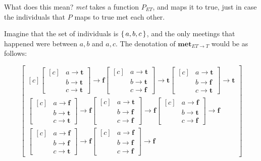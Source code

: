 \documentclass[letterpaper,parskip=half]{scrartcl}
\begin{document}
What does this mean? \emph{met} takes a function \(P_{ET}\), and maps it to true, just in case the individuals that \(P\) maps to true met each other.

Imagine that the set of individuals is \(\set{a,b,c}\), and the only meetings that happened were between \(a,b\) and \(a,c\). The denotation of \(\mathbf{met}_{ET \to T}\) would be as follows:

\[\left[\begin{aligned}[c]
\left[\begin{aligned}[c]
&a \to \mathbf{t}\\
&b \to \mathbf{t}\\
&c \to \mathbf{t}
\end{aligned}\right] \to \mathbf{f}
\left[\begin{aligned}[c]
&a \to \mathbf{t}\\
&b \to \mathbf{t}\\
&c \to \mathbf{f}
\end{aligned}\right] \to \mathbf{t}
\left[\begin{aligned}[c]
&a \to \mathbf{t}\\
&b \to \mathbf{f}\\
&c \to \mathbf{t}
\end{aligned}\right] \to \mathbf{t}\\
\left[\begin{aligned}[c]
&a \to \mathbf{f}\\
&b \to \mathbf{t}\\
&c \to \mathbf{t}
\end{aligned}\right] \to \mathbf{f}
\left[\begin{aligned}[c]
&a \to \mathbf{t}\\
&b \to \mathbf{f}\\
&c \to \mathbf{f}
\end{aligned}\right] \to \mathbf{f}
\left[\begin{aligned}[c]
&a \to \mathbf{f}\\
&b \to \mathbf{t}\\
&c \to \mathbf{f}
\end{aligned}\right] \to \mathbf{f}\\
\left[\begin{aligned}[c]
&a \to \mathbf{f}\\
&b \to \mathbf{f}\\
&c \to \mathbf{t}
\end{aligned}\right] \to \mathbf{f}
\left[\begin{aligned}[c]
&a \to \mathbf{f}\\
&b \to \mathbf{f}\\
&c \to \mathbf{f}
\end{aligned}\right] \to \mathbf{f}
\end{aligned}\right]\]
\end{document}
